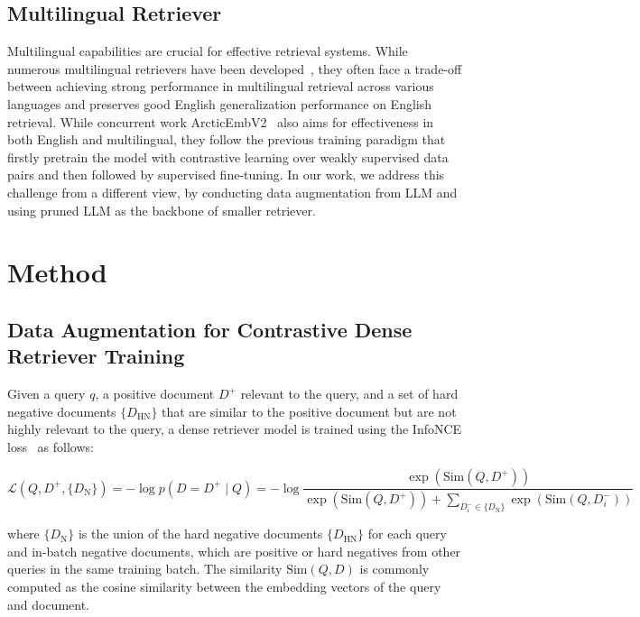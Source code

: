 \documentclass[]{fairmeta}
\begin{document}
\subsection{Multilingual Retriever}
Multilingual capabilities are crucial for effective retrieval systems.
While numerous multilingual retrievers have been developed~\citep{izacard2022unsup, wang2024me5, zhang2024mgte, chen-etal-2024-m3}, they often face a trade-off between achieving strong performance in multilingual retrieval across various languages and preserves good English generalization performance on English retrieval.
While concurrent work ArcticEmbV2~\citep{yu2024arcticembed} also aims for effectiveness in both English and multilingual, they follow the previous training paradigm that firstly pretrain the model with contrastive learning over weakly supervised data pairs and then followed by supervised fine-tuning.
In our work, we address this challenge from a different view, by conducting data augmentation from LLM and using pruned LLM as the backbone of smaller retriever.


\section{Method}

\subsection{Data Augmentation for Contrastive Dense Retriever Training}

Given a query $q$, a positive document $D^+$ relevant to the query, and a set of hard negative documents $\{D_{\text{HN}}\}$ that are similar to the positive document but are not highly relevant to the query, a dense retriever model is trained using the InfoNCE loss~\citep{oord2019infonce} as follows:

\begin{equation}
\label{eq:obj}
\mathcal{L}(Q, D^+, \{D_{\text{N}}\}) = -\log p(D = D^+ \mid Q) = 
-\log \frac{\exp(\text{Sim}(Q, D^+))}{\exp(\text{Sim}(Q, D^+)) + \sum\limits_{D_i^-\in\{D_{\text{N}}\}} \exp(\text{Sim}(Q, D_i^-))}
\end{equation}

\noindent where $\{D_\text{N}\}$ is the union of the hard negative documents $\{D_\text{HN}\}$ for each query and in-batch negative documents, which are positive or hard negatives from other queries in the same training batch. The similarity $\text{Sim}(Q, D)$ is commonly computed as the cosine similarity between the embedding vectors of the query and document.
\end{document}
